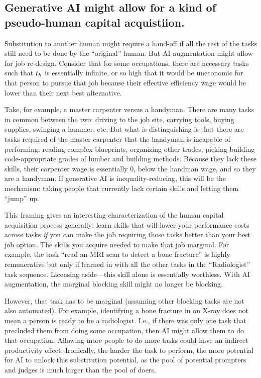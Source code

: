 \documentclass{article}
\theoremstyle{plain}
\theoremstyle{plain}
\begin{document}
\subsection{Generative AI might allow for a kind of pseudo-human capital acquistiion.}
Substitution to another human might require a hand-off if all the rest of the tasks still need to be done by the ``original'' human. 
But AI augmentation might allow for job re-design. 
Consider that for some occupations, there are necessary tasks such that $t_{h}$ is essentially infinite, or so high that it would be uneconomic for that person to pursue that job because their effective efficiency wage would be lower than their next best alternative.  

Take, for example, a master carpenter versus a handyman.
There are many tasks in common between the two: driving to the job site, carrying tools, buying supplies, swinging a hammer, etc.
But what is distinguishing is that there are tasks required of the master carpenter that the handyman is incapable of performing: 
reading complex blueprints, organizing other trades, picking building code-appropriate grades of lumber and building methods.
Because they lack these skills, their carpenter wage is essentially 0, below the handman wage, and so they are a handyman.
If generative AI is inequality-reducing, this will be the mechanism: taking people that currently lack certain skills and letting them ``jump'' up. 

This framing gives an interesting characterization of the human capital acquisition process generally: 
learn skills that will lower your performance costs across tasks \emph{if} you can make the job requiring those tasks better than your best job option.
The skills you acquire needed to make that job marginal. 
For example, the task ``read an MRI scan to detect a bone fracture'' is highly remunerative but only if learned in with all the other tasks in the ``Radiologist'' task sequence.
Licensing aside---this skill alone is essentially worthless.  
With AI augmentation, the marginal blocking skill might no longer be blocking. 

However, that task has to be marginal (assuming other blocking tasks are not also automated). 
For example, identifying a bone fracture in an X-ray does not mean a person is ready to be a radiologist.
I.e., if there was only one task that precluded them from doing some occupation, then AI might allow them to do that occupation.
Allowing more people to do more tasks could have an indirect productivity effect. 
Ironically, the harder the task to perform, the more potential for AI to unlock this substitution potential, as the pool of potential prompters and judges is much larger than the pool of doers.
\end{document}
